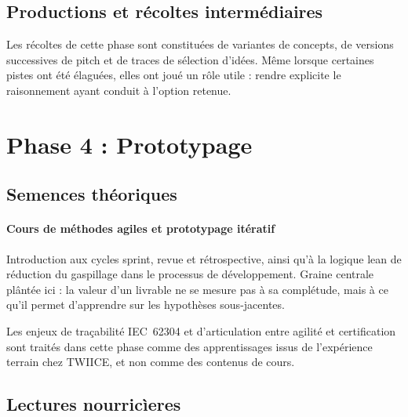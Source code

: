 \subsection{Productions et récoltes intermédiaires}

Les récoltes de cette phase sont constituées de variantes de concepts, de versions successives de pitch et de traces de sélection d'idées. Même lorsque certaines pistes ont été élaguées, elles ont joué un rôle utile : rendre explicite le raisonnement ayant conduit à l'option retenue.

\section{Phase 4 : Prototypage}


\subsection{Semences théoriques}

\paragraph{Cours de méthodes agiles et prototypage itératif}
Introduction aux cycles sprint, revue et rétrospective, ainsi qu'à la logique lean de réduction du gaspillage dans le processus de développement. Graine centrale plântée ici : la valeur d'un livrable ne se mesure pas à sa complétude, mais à ce qu'il permet d'apprendre sur les hypothèses sous-jacentes.

Les enjeux de traçabilité IEC~62304 et d'articulation entre agilité et certification sont traités dans cette phase comme des apprentissages issus de l'expérience terrain chez TWIICE, et non comme des contenus de cours.


\subsection{Lectures nourric\`ieres}

